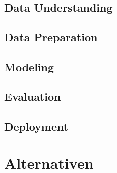 \subsection{Data Understanding}
\label{sec:process:crispdm:du}



\subsection{Data Preparation}
\label{sec:process:crispdm:dp}

\subsection{Modeling}
\label{sec:process:crispdm:mod}

\subsection{Evaluation}
\label{sec:process:crispdm:eval}

\subsection{Deployment}
\label{sec:process:crispdm:depl}

\section{Alternativen}
\label{sec:alt}
